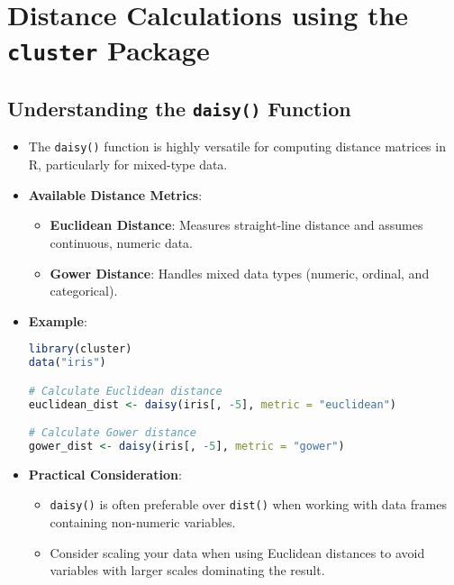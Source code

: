 \documentclass{article}
\begin{document}
\section{Distance Calculations using the \texttt{cluster} Package}
\subsection{Understanding the \texttt{daisy()} Function}
\begin{itemize}
    \item The \texttt{daisy()} function is highly versatile for computing distance matrices in R, particularly for mixed-type data.
    \item \textbf{Available Distance Metrics}:
    \begin{itemize}
        \item \textbf{Euclidean Distance}: Measures straight-line distance and assumes continuous, numeric data.
        \item \textbf{Gower Distance}: Handles mixed data types (numeric, ordinal, and categorical).
    \end{itemize}
    \item \textbf{Example}:
\begin{lstlisting}[language=R]
library(cluster)
data("iris")

# Calculate Euclidean distance
euclidean_dist <- daisy(iris[, -5], metric = "euclidean")

# Calculate Gower distance
gower_dist <- daisy(iris[, -5], metric = "gower")
\end{lstlisting}
\item \textbf{Practical Consideration}:
    \begin{itemize}
        \item \texttt{daisy()} is often preferable over \texttt{dist()} when working with data frames containing non-numeric variables.
        \item Consider scaling your data when using Euclidean distances to avoid variables with larger scales dominating the result.
    \end{itemize}
\end{itemize}
\end{document}
